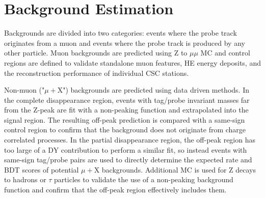 \begin{table}[htbp]
\label{tab:partialDisappearCutFlow}
\centering
{}
\end{table}

\section{Background Estimation}
Backgrounds are divided into two categories: events where the probe track originates from a muon and events where the probe track is produced by any other particle.
Muon backgrounds are predicted using Z to $\mu\mu$ MC and control regions are defined to validate standalone muon features, HE energy deposits, and the reconstruction performance of individual CSC stations.

Non-muon ("$\mu+$X") backgrounds are predicted using data driven methods.
In the complete disappearance region, events with tag/probe invariant masses far from the Z-peak are fit with a non-peaking function and extrapolated into the signal region. The resulting off-peak prediction is compared with a same-sign control region to confirm that the background does not originate from charge correlated processes.
In the partial disappearance region, the off-peak region has too large of a DY contribution to perform a similar fit, so instead events with same-sign tag/probe pairs are used to directly determine the expected rate and BDT scores of potential $\mu+$X backgrounds.
Additional MC is used for Z decays to hadrons or $\tau$ particles to validate the use of a non-peaking background function and confirm that the off-peak region effectively includes them.

